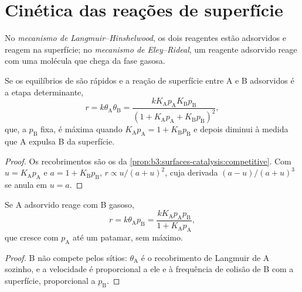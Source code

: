 \section{Cinética das reações de superfície}

\begin{definition}\label{def:b3:surfaces-catalysis:mechanisms}
No \emph{mecanismo de Langmuir--Hinshelwood}, os
dois reagentes estão adsorvidos e reagem na superfície; no \emph{mecanismo de
Eley--Rideal}, um reagente adsorvido reage com uma
molécula que chega da fase gasosa.
\end{definition}

\begin{proposition}\label{prop:b3:surfaces-catalysis:lh-rate}
Se os equilíbrios de  são rápidos e a reação de superfície entre A e B
adsorvidos é a etapa determinante,
\[
  r = k\theta_{\mathrm A}\theta_{\mathrm B} = \frac{kK_{\mathrm A}p_{\mathrm A}K_{\mathrm B}p_{\mathrm B}}{(1 + K_{\mathrm A}p_{\mathrm A} + K_{\mathrm B}p_{\mathrm B})^2},
\]
que, a $p_{\mathrm B}$ fixa, é máxima quando $K_{\mathrm A}p_{\mathrm A} = 1 + K_{\mathrm B}p_{\mathrm B}$ e depois diminui à medida que A
expulsa B da superfície.
\end{proposition}

\begin{proof}
Os recobrimentos são os da \cref{prop:b3:surfaces-catalysis:competitive}. Com $u =
K_{\mathrm A}p_{\mathrm A}$ e $a = 1 + K_{\mathrm B}p_{\mathrm B}$, $r \propto u/(a + u)^2$, cuja derivada $(a - u)/(a + u)^3$ se anula em
$u = a$.
\end{proof}

\begin{proposition}\label{prop:b3:surfaces-catalysis:er-rate}
Se A adsorvido reage com B gasoso,
\[
  r = k\theta_{\mathrm A}p_{\mathrm B} = \frac{kK_{\mathrm A}p_{\mathrm A}p_{\mathrm B}}{1 + K_{\mathrm A}p_{\mathrm A}},
\]
que cresce com $p_{\mathrm A}$ até um patamar, sem máximo.
\end{proposition}

\begin{proof}
B não compete pelos sítios: $\theta_{\mathrm A}$ é o recobrimento de Langmuir de A sozinho, e a
velocidade é proporcional a ele e à frequência de colisão de B com a superfície,
proporcional a $p_{\mathrm B}$.
\end{proof}

